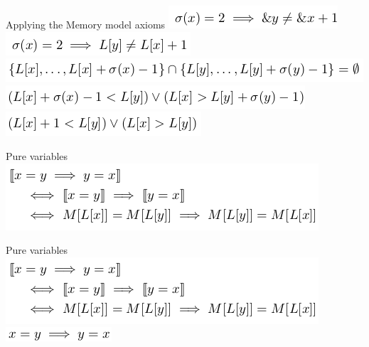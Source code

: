 \documentclass{beamer}
\begin{document}
\begin{frame}{Applying the Memory model axioms}
\includegraphics[scale=0.5]{meory1.png}\newline
\includegraphics[scale=0.5]{meory2.png}\newline
\includegraphics[scale=0.5]{meory3.png}\newline
\includegraphics[scale=0.5]{meory4.png}\newline
\includegraphics[scale=0.5]{meory5.png}\newline
\end{frame}

\begin{frame}{Pure variables}
\includegraphics[scale=0.5]{ex_pure.png}\newline
\end{frame}

\begin{frame}{Pure variables}
\includegraphics[scale=0.5]{ex_pure.png}\newline
\includegraphics[scale=0.5]{ex_pure2.png}\newline
\end{frame}
\end{document}
